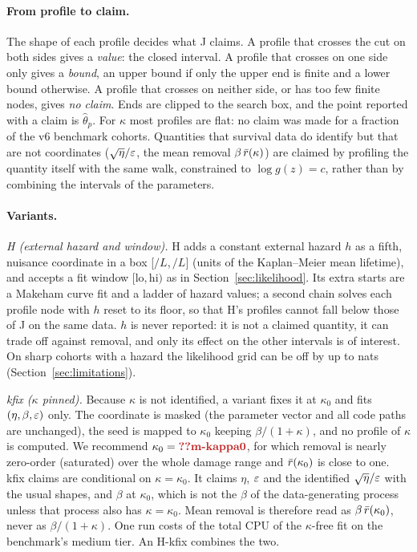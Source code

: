 \paragraph{From profile to claim.} The shape of each profile decides what J claims. A profile that crosses the cut on both
sides gives a \emph{value}: the closed interval. A profile that crosses on one side only gives a \emph{bound}, an upper
bound if only the upper end is finite and a lower bound otherwise. A profile that crosses on neither side, or has too few
finite nodes, gives \emph{no claim}. Ends are clipped to the search box, and the point reported with a claim is
$\hat\theta_p$. For $\kappa$ most profiles are flat: no claim was made for a fraction  of the v6 benchmark
cohorts. Quantities that survival data do identify but that are not coordinates ($\sqrt\eta/\varepsilon$, the mean removal
$\beta\,\bar r(\kappa)$) are claimed by profiling the quantity itself with the same walk, constrained to $\log g(z)=c$, rather
than by combining the intervals of the parameters.

\paragraph{Variants.}
\emph{H (external hazard and window).} H adds a constant external hazard $h$ as a fifth, nuisance coordinate in a box
[$/L$,\,$/L$] (units of the Kaplan--Meier mean lifetime), and accepts a fit window $[\mathrm{lo},\mathrm{hi})$ as in
Section~\ref{sec:likelihood}. Its extra starts are a Makeham curve fit and a ladder of hazard values; a second chain solves each
profile node with $h$ reset to its floor, so that H's profiles cannot fall below those of J on the same data. $h$ is never
reported: it is not a claimed quantity, it can trade off against removal, and only its effect on the other intervals is of
interest. On sharp cohorts with a hazard the likelihood grid can be off by up to  nats (Section~\ref{sec:limitations}).

\emph{kfix ($\kappa$ pinned).} Because $\kappa$ is not identified, a variant fixes it at $\kappa_0$ and fits $(\eta,\beta,\varepsilon)$ only.
The coordinate is masked (the parameter vector and all code paths are unchanged), the seed is mapped to $\kappa_0$ keeping
$\beta/(1+\kappa)$, and no profile of $\kappa$ is computed. We recommend $\kappa_0=\C{m-kappa0}$, for which removal is nearly zero-order
(saturated) over the whole damage range and $\bar r(\kappa_0)$ is close to one. kfix claims are conditional on $\kappa=\kappa_0$. It
claims $\eta$, $\varepsilon$ and the identified $\sqrt\eta/\varepsilon$ with the usual shapes, and $\beta$ at $\kappa_0$, which is not the
$\beta$ of the data-generating process unless that process also has $\kappa=\kappa_0$. Mean removal is therefore read as
$\beta\,\bar r(\kappa_0)$, never as $\beta/(1+\kappa)$. One run costs  of the total CPU of the $\kappa$-free fit on the benchmark's
medium tier. An H-kfix combines the two.

